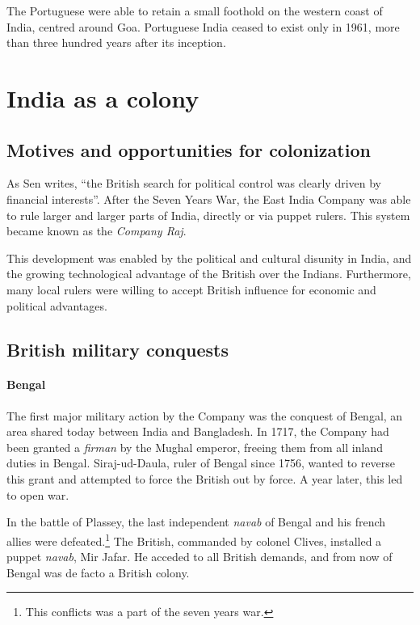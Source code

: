 \documentclass[11pt, a4paper, headings=standardclasses]{scrartcl}
\begin{document}
The Portuguese were able to retain a small foothold on the western coast of India, centred around Goa. Portuguese India ceased to exist only in 1961, more than three hundred years after its inception.\autocite{PortugueseIndia}

\section{India as a colony}

\subsection{Motives and opportunities for colonization}

As Sen writes, ``the British search for political control was clearly driven by financial interests''\autocite[Section 3]{tnr}. After the Seven Years War, the East India Company was able to rule larger and larger parts of India, directly or via puppet rulers. This system became known as the \textit{Company Raj}.\autocite{parliament}

This development was enabled by the political and cultural disunity in India, and the growing technological advantage of the British over the Indians. Furthermore, many local rulers were willing to accept British influence for economic and political advantages.

\subsection{British military conquests}

\paragraph{Bengal}
The first major military action by the Company was the conquest of Bengal, an area shared today between India and Bangladesh. In 1717, the Company had been granted a \textit{firman} by the Mughal emperor, freeing them from all inland duties in Bengal.\autocite[257]{RF} Siraj-ud-Daula, ruler of Bengal since 1756, wanted to reverse this grant and attempted to force the British out by force. A year later, this led to open war.\autocite[258]{RF}

In the battle of Plassey, the last independent \textit{navab} of Bengal and his french allies were defeated.\footnote{This conflicts was a part of the seven years war.} The British, commanded by colonel Clives, installed a puppet \textit{navab}, Mir Jafar. He acceded to all British demands, and from now of Bengal was de facto a British colony.\autocite[268]{RF}
\end{document}
